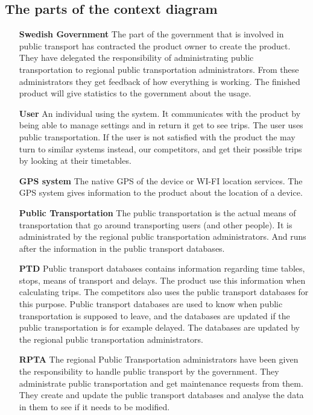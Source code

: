 \documentclass[a4paper]{article}
\begin{document}
	\subsection{The parts of the context diagram}			
		\begin{itemize}
			\item[\textbf{Swedish Government}] The part of the government that is involved in public transport has contracted the product owner to create the product. They have delegated the responsibility of administrating public transportation to regional public transportation administrators. From these administrators they get feedback of how everything is working. The finished product will give statistics to the government about the usage.
			\item[\textbf{User}] An individual using the system. It communicates with the product by being able to manage settings and in return it get to see trips. The user uses public transportation. If the user is not satisfied with the product the may turn to similar systems instead, our competitors, and get their possible trips by looking at their timetables.
			\item[\textbf{GPS system}] The native GPS of the device or WI-FI location services. The GPS system gives information to the product about the location of a device.
			\item[\textbf{Public Transportation}] The public transportation is the actual means of transportation that go around transporting users (and other people). It is administrated by the regional public transportation administrators. And runs after the information in the public transport databases.
			\item[\textbf{PTD}] Public transport databases contains information regarding time tables, stops, means of transport and delays. The product use this information when calculating trips. The competitors also uses the public transport databases for this purpose. Public transport databases are used to know when public transportation is supposed to leave, and the databases are updated if the public transportation is for example delayed. The databases are updated by the regional public transportation administrators.
			\item[\textbf{RPTA}] The regional Public Transportation administrators have been given the responsibility to handle public transport by the government. They administrate public transportation and get maintenance requests from them. They create and update the public transport databases and analyse the data in them to see if it needs to be modified.
			

\end{itemize}
\end{document}
